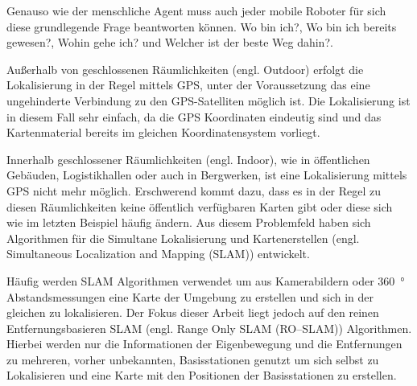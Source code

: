 \documentclass[12pt]{article}
\begin{document}
Genauso wie der menschliche Agent muss auch jeder mobile Roboter für sich diese grundlegende Frage beantworten können. \glqq Wo bin ich?\grqq{}, \glqq Wo bin ich bereits gewesen?\grqq, \glqq Wohin gehe ich?\grqq{} und \glqq Welcher ist der beste Weg dahin?\grqq{}.

Außerhalb von geschlossenen Räumlichkeiten (engl. Outdoor) erfolgt die Lokalisierung in der Regel mittels GPS, unter der Voraussetzung das eine ungehinderte Verbindung zu den GPS-Satelliten möglich ist. Die Lokalisierung ist in diesem Fall sehr einfach, da die GPS Koordinaten eindeutig sind und das Kartenmaterial bereits im gleichen Koordinatensystem vorliegt.

Innerhalb geschlossener Räumlichkeiten (engl. Indoor), wie in öffentlichen Gebäuden, Logistikhallen oder auch in Bergwerken, ist eine Lokalisierung mittels GPS nicht mehr möglich. Erschwerend kommt dazu, dass es in der Regel zu diesen Räumlichkeiten keine öffentlich verfügbaren Karten gibt oder diese sich wie im letzten Beispiel häufig ändern. Aus diesem Problemfeld haben sich Algorithmen für die Simultane Lokalisierung und Kartenerstellen (engl. Simultaneous Localization and Mapping (SLAM)) entwickelt.

Häufig werden SLAM Algorithmen verwendet um aus Kamerabildern oder \SI{360}{\degree} Abstandsmessungen eine Karte der Umgebung zu erstellen und sich in der gleichen zu lokalisieren. Der Fokus dieser Arbeit liegt jedoch auf den reinen Entfernungsbasieren SLAM (engl. Range Only SLAM (RO--SLAM)) Algorithmen. Hierbei werden nur die Informationen der Eigenbewegung und die Entfernungen zu mehreren, vorher unbekannten, Basisstationen genutzt um sich selbst zu Lokalisieren und eine Karte mit den Positionen der Basisstationen zu erstellen.
\end{document}
